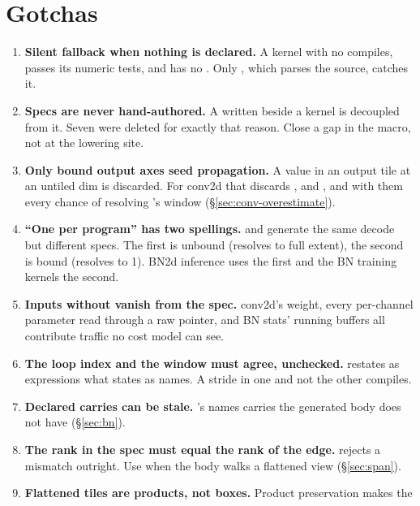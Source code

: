 \section{Gotchas}
\label{sec:gotchas}

\begin{enumerate}[leftmargin=1.4em,itemsep=0.45em]
\item \textbf{Silent fallback when nothing is declared.} A  kernel with no
  \code{#[tile]} compiles, passes its numeric tests, and has no .
  Only , which parses the source, catches it.
\item \textbf{Specs are never hand-authored.} A  written beside a
  kernel is decoupled from it. Seven were deleted for exactly that reason. Close a gap
  in the macro, not at the lowering site.
\item \textbf{Only bound output axes seed propagation.} A value in an output tile at an
  untiled dim is discarded. For conv2d that discards ,  and
  , and with them every chance of resolving 's  window
  (\S\ref{sec:conv-overestimate}).
\item \textbf{``One per program'' has two spellings.} \code{#[tile(extent = C)]} and
  \code{#[tile(block = 1, extent = C)]} generate the same decode but different specs.
  The first is unbound (resolves to full extent), the second is bound (resolves to 1).
  BN2d inference uses the first and the BN training kernels the second.
\item \textbf{Inputs without \code{#[tile]} vanish from the spec.} conv2d's weight,
  every per-channel parameter read through a raw pointer, and BN stats' running
  buffers all contribute traffic no cost model can see.
\item \textbf{The loop index and the window must agree, unchecked.}
  \code{#[tile_loop_tile(index = ..)]} restates as expressions what 
  states as names. A stride in one and not the other compiles.
\item \textbf{Declared carries can be stale.} 's
   names carries the generated body does not have (\S\ref{sec:bn}).
\item \textbf{The rank in the spec must equal the rank of the edge.}
   rejects a mismatch outright. Use  when the body
  walks a flattened view (\S\ref{sec:span}).
\item \textbf{Flattened tiles are products, not boxes.} Product preservation makes the

\end{enumerate}
